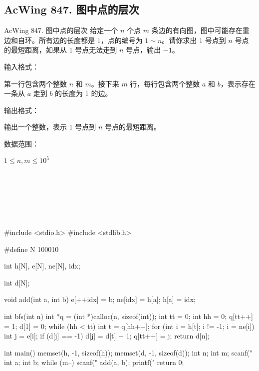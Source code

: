 \subsection{AcWing 847. 图中点的层次}
\begin{titledbox}{AcWing 847. 图中点的层次}
    给定一个 $n$ 个点 $m$ 条边的有向图，图中可能存在重边和自环。所有边的长度都是 $1$，点的编号为 $1 \sim n$。请你求出 $1$ 号点到 $n$ 号点的最短距离，如果从 $1$ 号点无法走到 $n$ 号点，输出 $-1$。

    输入格式：

    第一行包含两个整数 $n$ 和 $m$。接下来 $m$ 行，每行包含两个整数 $a$ 和 $b$，表示存在一条从 $a$ 走到 $b$ 的长度为 $1$ 的边。

    输出格式：

    输出一个整数，表示 $1$ 号点到 $n$ 号点的最短距离。

    数据范围：

    $1 \le n,m \le 10^5$

    \begin{inputblock}
         \\
         \\
         \\
         \\
         \\
    \end{inputblock}
    \begin{outputblock}
    \end{outputblock}
\end{titledbox}

\begin{mycpptwocol}[图的BFS]
    #include <stdio.h>
    #include <stdlib.h>

    #define N 100010

    int h[N], e[N], ne[N], idx;

    int d[N];

    void add(int a, int b) {
        e[++idx] = b;
        ne[idx] = h[a];
        h[a] = idx;
    }

    int bfs(int n) {
        int *q = (int *)calloc(n, sizeof(int));
        int tt = 0;
        int hh = 0;
        q[tt++] = 1;
        d[1] = 0;
        while (hh < tt) {
            int t = q[hh++];
            for (int i = h[t]; i != -1; i = ne[i]) {
                int j = e[i];
                if (d[j] == -1) {
                    d[j] = d[t] + 1;
                    q[tt++] = j;
                }
            }
        }
        return d[n];
    }

    int main() {
        memset(h, -1, sizeof(h));
        memset(d, -1, sizeof(d));
        int n;
        int m;
        scanf("%
        int a;
        int b;
        while (m--) {
            scanf("%
            add(a, b);
        }
        printf("%
        return 0;
    }
\end{mycpptwocol}


